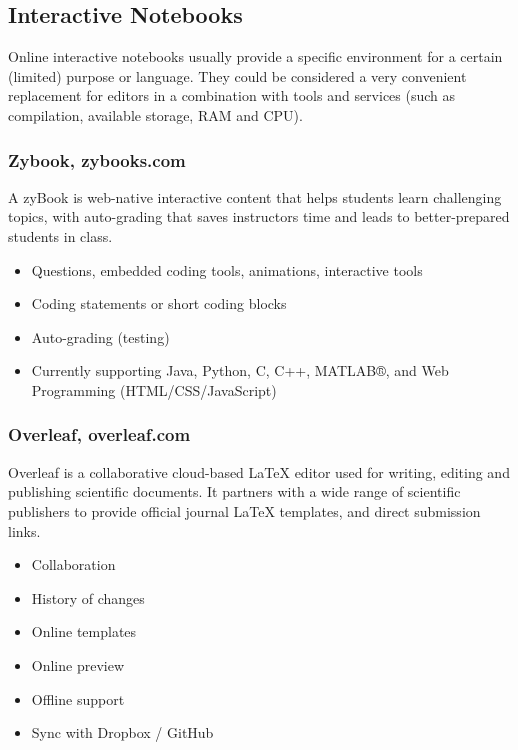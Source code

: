 \subsection{Interactive Notebooks} \label{ssec:notebooks}

{Online interactive notebooks usually provide a specific environment for a certain (limited) purpose or language. They could be considered a very convenient replacement for editors in a combination with tools and services (such as compilation, available storage, RAM and CPU).}

\subsubsection{Zybook, zybooks.com}

{A zyBook is web-native interactive content that helps students learn challenging topics, with auto-grading that saves instructors time and leads to better-prepared students in class.}

\begin{itemize}
\item
  {Questions, embedded coding tools, animations, interactive tools}
\item
  {Coding statements or short coding blocks}
\item
  {Auto-grading (testing)}
\item
  {Currently supporting Java, Python, C, C++, MATLAB®, and Web Programming (HTML/CSS/JavaScript)}
\end{itemize}

\subsubsection{Overleaf, overleaf.com}

{Overleaf is a collaborative cloud-based LaTeX editor used for writing, editing and publishing scientific documents. It partners with a wide range of scientific publishers to provide official journal LaTeX templates, and direct submission links.}

\begin{itemize}
\item
  {Collaboration}
\item
  {History of changes}
\item
  {Online templates}
\item
  {Online preview}
\item
  {Offline support}
\item
  {Sync with Dropbox / GitHub}
\end{itemize}

